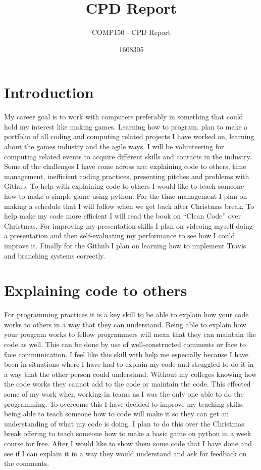 \documentclass{scrartcl}
\title{CPD Report}
\subtitle{COMP150 - CPD Report}
\author{1608305}
\begin{document}
\maketitle

\section{Introduction}

My career goal is to work with computers preferably in something that could hold my interest like making games.
Learning how to program, plan to make a portfolio of all coding and computing related projects I have worked on, learning about the games industry and the agile ways. I will be volunteering for computing related events to acquire different skills and contacts in the industry.
Some of the challenges I have come across are: explaining code to others, time management, inefficient coding practices, presenting pitches and problems with Github.
To help with explaining code to others I would like to teach someone how to make a simple game using python. For the time management I plan on making a schedule that I will follow when we get back after Christmas break. To help make my code more efficient I will read the book on “Clean Code” over Christmas. For improving my presentation skills I plan on videoing myself doing a presentation and then self-evaluating my performance to see how I could improve it. Finally for the Github I plan on learning how to implement Travis and branching systems correctly.



\section{Explaining code to others}

For programming practices it is a key skill to be able to explain how your code works to others in a way that they can understand. Being able to explain how your program works to fellow programmers will mean that they can maintain the code as well. This can be done by use of well-constructed comments or face to face communication. I feel like this skill with help me especially because I have been in situations where I have had to explain my code and struggled to do it in a way that the other person could understand. Without my colleges knowing how the code works they cannot add to the code or maintain the code. This effected some of my work when working in teams as I was the only one able to do the programming. To overcome this I have decided to improve my teaching skills, being able to teach someone how to code will make it so they can get an understanding of what my code is doing. I plan to do this over the Christmas break offering to teach someone how to make a basic game on python in a week course for free. After I would like to show them some code that I have done and see if I can explain it in a way they would understand and ask for feedback on the comments.
\end{document}
